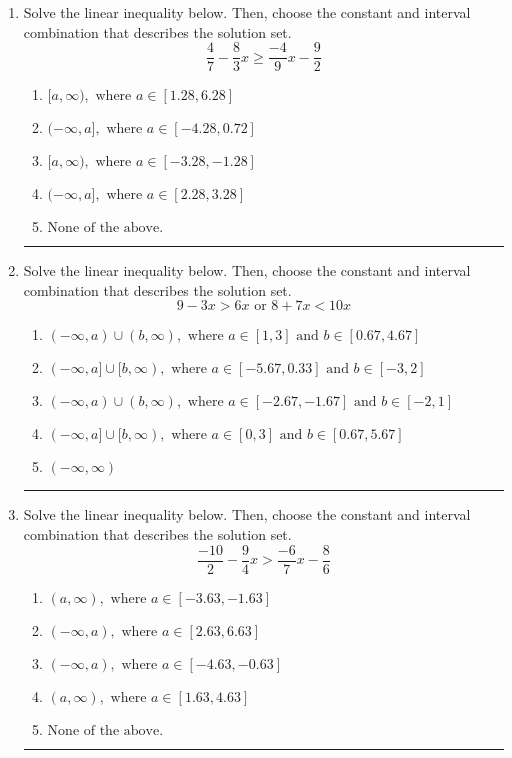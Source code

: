 \documentclass[14pt]{extbook}
\newcommand{\litem}[1]{\item#1\hspace*{-1cm}\rule{\textwidth}{0.4pt}}
\begin{document}
\begin{enumerate}
{\begin{enumerate}[label=\Alph*.]
\end{enumerate} }
\litem{
Solve the linear inequality below. Then, choose the constant and interval combination that describes the solution set.\[ \frac{4}{7} - \frac{8}{3} x \geq \frac{-4}{9} x - \frac{9}{2} \]\begin{enumerate}[label=\Alph*.]
\item \( [a, \infty), \text{ where } a \in [1.28, 6.28] \)
\item \( (-\infty, a], \text{ where } a \in [-4.28, 0.72] \)
\item \( [a, \infty), \text{ where } a \in [-3.28, -1.28] \)
\item \( (-\infty, a], \text{ where } a \in [2.28, 3.28] \)
\item \( \text{None of the above}. \)

\end{enumerate} }
\litem{
Solve the linear inequality below. Then, choose the constant and interval combination that describes the solution set.\[ 9 - 3 x > 6 x \text{ or } 8 + 7 x < 10 x \]\begin{enumerate}[label=\Alph*.]
\item \( (-\infty, a) \cup (b, \infty), \text{ where } a \in [1, 3] \text{ and } b \in [0.67, 4.67] \)
\item \( (-\infty, a] \cup [b, \infty), \text{ where } a \in [-5.67, 0.33] \text{ and } b \in [-3, 2] \)
\item \( (-\infty, a) \cup (b, \infty), \text{ where } a \in [-2.67, -1.67] \text{ and } b \in [-2, 1] \)
\item \( (-\infty, a] \cup [b, \infty), \text{ where } a \in [0, 3] \text{ and } b \in [0.67, 5.67] \)
\item \( (-\infty, \infty) \)

\end{enumerate} }
\litem{
Solve the linear inequality below. Then, choose the constant and interval combination that describes the solution set.\[ \frac{-10}{2} - \frac{9}{4} x > \frac{-6}{7} x - \frac{8}{6} \]\begin{enumerate}[label=\Alph*.]
\item \( (a, \infty), \text{ where } a \in [-3.63, -1.63] \)
\item \( (-\infty, a), \text{ where } a \in [2.63, 6.63] \)
\item \( (-\infty, a), \text{ where } a \in [-4.63, -0.63] \)
\item \( (a, \infty), \text{ where } a \in [1.63, 4.63] \)
\item \( \text{None of the above}. \)


\end{enumerate}}
\end{enumerate}
\end{document}
